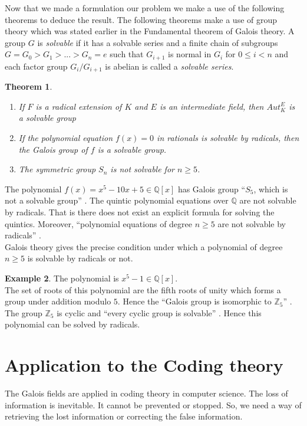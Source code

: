 \documentclass[a4paper,twoside,10pt]{article}
\theoremstyle{plain}
\newtheorem{theorem}{Theorem}[section]
\theoremstyle{definition}
\newtheorem{example}[theorem]{Example}
\begin{document}
Now that we made a formulation our problem we make a use of the following theorems to deduce the result. The following theorems make a use of group theory which was stated earlier in the Fundamental theorem of Galois theory. A group \(G\) is \textit{solvable} if it has a solvable series and a finite chain of subgroups \(G=G_0>G_1>...>G_n={e}\) such that \(G_{i+1}\) is normal in \(G_i\) for \(0 \leq i < n\) and  each factor group \(G_i/G_{i+1}\) is abelian is called a \textit{solvable series}.
\begin{theorem} \cite{hunger}
  \begin{enumerate}
  \item If \(F\) is a radical extension of \(K\) and \(E\) is an intermediate field, then \(Aut_K^E\) is a solvable group
    \item If the polynomial equation \(f(x)=0\) in rationals is solvable by radicals, then the Galois group of \(f\) is a solvable group.
    \item The symmetric group \(S_n\) is not solvable for \(n \geq 5\).
      \end{enumerate}
\end{theorem}

\noindent
The polynomial \(f(x)=x^5-10x+5 \in \mathbb{Q}[x]\) has Galois group ``\(S_5\), which is not a solvable group'' \cite{hunger}. The quintic polynomial equations over \(\mathbb{Q}\) are not solvable by radicals. That is there does not exist an explicit formula for solving the quintics. Moreover, ``polynomial equations of degree \(n \geq 5\) are not solvable by radicals'' \cite{hunger}.\\[2mm]

\noindent
Galois theory gives the precise condition under which a polynomial of degree \(n \geq 5\) is solvable by radicals or not.
\begin{example}
  The polynomial is \(x^5-1 \in \mathbb{Q}[x]\).\\
  The set of  roots of this polynomial are the fifth roots of unity which forms a group under addition modulo \(5\). Hence the ``Galois group is isomorphic to \(\mathbb{Z}_5\)'' \cite{hunger}. The group \(\mathbb{Z}_5\) is cyclic and ``every cyclic group is solvable'' \cite{galois}. Hence this polynomial can be  solved by radicals.
\end{example}

\section{Application to the Coding theory}
The Galois fields are applied in coding theory in computer science. The loss of information is inevitable. It cannot be prevented or stopped. So, we need a way of retrieving the lost information or correcting the false information.
\end{document}
